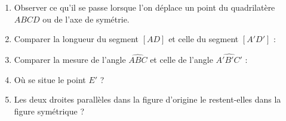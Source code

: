\begin{activite}
\begin{QCM}
         \begin{enumerate}
            \item Observer ce qu'il se passe lorsque l'on déplace un point du quadrilatère $ABCD$ ou de l'axe de symétrie.
            \item Comparer la longueur du segment $[AD]$ et celle du segment $[A'D']$ : \pfb \smallskip
            \item Comparer la mesure de l'angle $\widehat{ABC}$ et celle de l'angle $\widehat{A'B'C'}$ : \pfb \smallskip
            \item Où se situe le point $E'$ ? \pfb \smallskip
            \item Les deux droites parallèles dans la figure d'origine le restent-elles dans la figure symétrique ? \pfb \smallskip
         \end{enumerate}


\end{QCM}
\end{activite}
